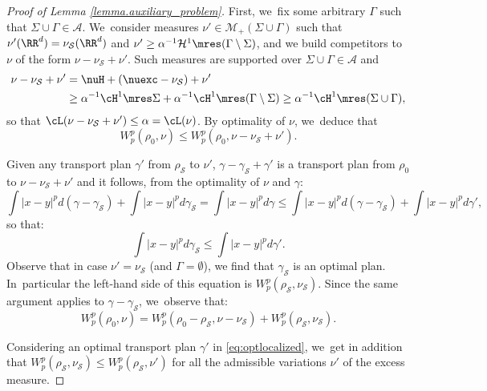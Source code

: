 \begin{proof}[Proof of Lemma \ref{lemma.auxiliary_problem}]
First, we~fix some arbitrary $\Gamma$ such that $\Sigma \cup \Gamma \in \mathcal{A}$. We~consider measures $\nu' \in \mathcal{M}_+(\Sigma\cup \Gamma)$ such that $\nu'(\RR^d) = \nu_{\mathcal{S}}(\RR^d)$ and $\nu' \ge \alpha^{-1}\mathcal{H}^1\mres (\Gamma\setminus \Sigma)$, and we build competitors to $\nu$ of the form $\nu - \nu_{\mathcal{S}} + \nu'$. Such measures are supported over $\Sigma \cup \Gamma \in \mathcal{A}$ and
\begin{align*}
\nu - \nu_{\mathcal{S}} + \nu'
&=
\nuH + (\nuexc - \nu_{\mathcal{S}}) + \nu'\\
&\ge
\alpha^{-1}\cH^1\mres \Sigma + \alpha^{-1}\cH^1\mres (\Gamma\setminus \Sigma)
\ge \alpha^{-1}\cH^1\mres (\Sigma \cup \Gamma),
\end{align*}
so that $\cL(\nu - \nu_{\mathcal{S}} + \nu') \le \alpha =\cL(\nu)$. By optimality of $\nu$, we~deduce that
\begin{equation*}
W_p^p(\rho_0, \nu) \le W_p^p(\rho_0, \nu - \nu_{\mathcal{S}} + \nu').
\end{equation*}

Given any transport plan $\gamma'$ from
$\rho_{\mathcal{S}}$ to $\nu'$, $\gamma-\gamma_{\mathcal{S}}+\gamma'$
is a transport plan from $\rho_0$ to $\nu - \nu_{\mathcal{S}} + \nu'$
and it follows, from the optimality of $\nu$ and $\gamma$:
\[
\int |x-y|^p d(\gamma-\gamma_{\mathcal S}) + \int |x-y|^p d\gamma_{\mathcal S} = \int |x-y|^p d\gamma
\le
\int |x-y|^p d(\gamma-\gamma_{\mathcal S}) + \int |x-y|^p d\gamma',
\]
so that:
\begin{equation}\label{eq:optlocalized}
\int |x-y|^p d\gamma_{\mathcal S}\le \int |x-y|^p d\gamma'.
\end{equation}
Observe that in case $\nu'=\nu_{\mathcal{S}}$ (and $\Gamma=\emptyset$),
we find that
$\gamma_{\mathcal{S}}$ is an optimal plan.
In~particular the left-hand side of this equation
is $W_p^p(\rho_{\mathcal{S}}, \nu_{\mathcal{S}})$.
Since the same argument applies to $\gamma-\gamma_{\mathcal{S}}$, we~observe
that:
\begin{equation}\label{rhoexc_decomposition_finer}
W_p^p(\rho_0, \nu)
=
W_p^p\left(\rho_0 - \rho_{\mathcal{S}}, \nu -\nu_{\mathcal{S}}\right)
+ W_p^p(\rho_{\mathcal{S}},\nu_{\mathcal{S}}).
\end{equation}

Considering an optimal transport plan $\gamma'$ in
\eqref{eq:optlocalized}, we~get in addition that $W_p^p\left(\rho_{\mathcal{S}}, \nu_{\mathcal{S}}\right) \le W_p^p\left(\rho_{\mathcal{S}}, \nu'\right)$
for all the admissible variations $\nu'$ of the excess measure.


\end{proof}
